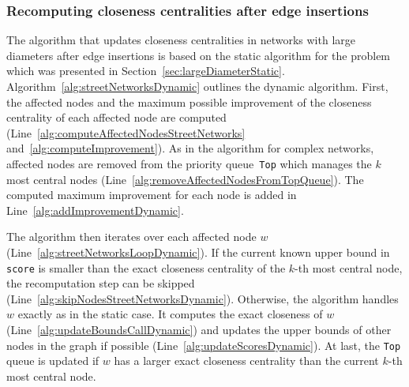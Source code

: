 
\subsubsection{Recomputing closeness centralities after edge insertions}
The algorithm that updates closeness centralities in networks with large diameters after edge insertions is based on the static algorithm for the problem which was presented in Section~\ref{sec:largeDiameterStatic}. Algorithm~\ref{alg:streetNetworksDynamic} outlines the dynamic algorithm. First, the affected nodes and the maximum possible improvement of the closeness centrality of each affected node are computed (Line~\ref{alg:computeAffectedNodesStreetNetworks} and~\ref{alg:computeImprovement}). As in the algorithm for complex networks, affected nodes are removed from the priority queue \texttt{Top} which manages the $k$ most central nodes (Line~\ref{alg:removeAffectedNodesFromTopQueue}). The computed maximum improvement for each node is added in Line~\ref{alg:addImprovementDynamic}.

The algorithm then iterates over each affected node $w$ (Line~\ref{alg:streetNetworksLoopDynamic}). If the current known upper bound in \texttt{score} is smaller than the exact closeness centrality of the $k$-th most central node, the recomputation step can be skipped (Line~\ref{alg:skipNodesStreetNetworksDynamic}). Otherwise, the algorithm handles $w$ exactly as in the static case. It computes the exact closeness of $w$ (Line~\ref{alg:updateBoundsCallDynamic}) and updates the upper bounds of other nodes in the graph if possible (Line~\ref{alg:updateScoresDynamic}). At last, the \texttt{Top} queue is updated if $w$ has a larger exact closeness centrality than the current $k$-th most central node.

